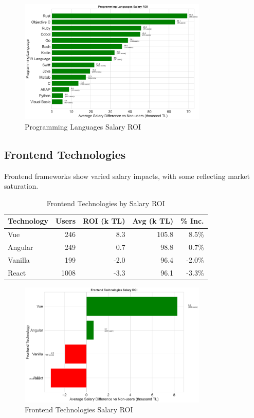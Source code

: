 \documentclass[12pt,a4paper]{article}
\begin{document}
\begin{figure}[H]
	\centering
	\includegraphics[width=0.8\textwidth]{figures/barplot_programming_roi.png}
	\caption{Programming Languages Salary ROI}
\end{figure}

\subsection{Frontend Technologies}
Frontend frameworks show varied salary impacts, with some reflecting market saturation.

\begin{table}[H]
	\centering
	\small
	\begin{tabular}{lrrrr}
		\toprule
		\textbf{Technology} & \textbf{Users} & \textbf{ROI (k TL)} & \textbf{Avg (k TL)} & \textbf{\% Inc.} \\
		\midrule
		Vue                 & 246            & 8.3                 & 105.8               & 8.5\%            \\
		Angular             & 249            & 0.7                 & 98.8                & 0.7\%            \\
		Vanilla             & 199            & -2.0                & 96.4                & -2.0\%           \\
		React               & 1008           & -3.3                & 96.1                & -3.3\%           \\
		\bottomrule
	\end{tabular}
	\caption{Frontend Technologies by Salary ROI}
\end{table}

\begin{figure}[H]
	\centering
	\includegraphics[width=0.8\textwidth]{figures/barplot_frontend_roi.png}
	\caption{Frontend Technologies Salary ROI}
\end{figure}
\end{document}
